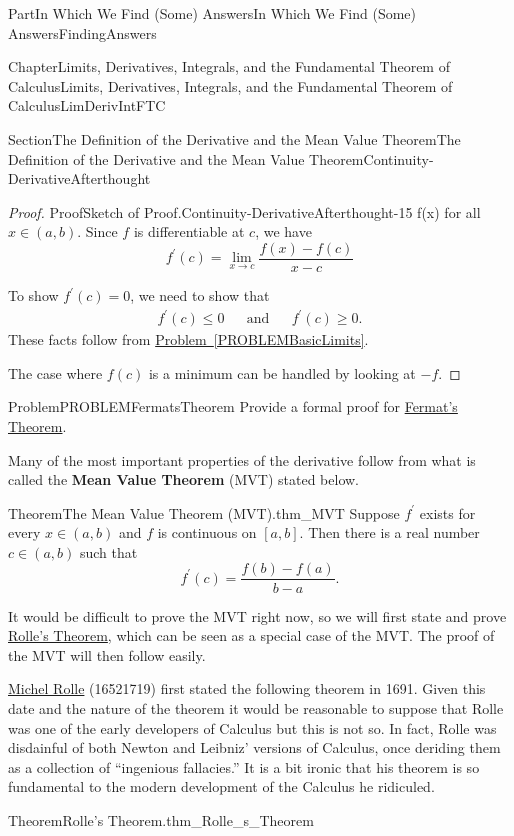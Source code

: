 \documentclass[oneside,10pt,]{book}
\newcommand{\xreffont}{\relax}
\DeclareRobustCommand{\initialismintitle}[1]{\texorpdfstring{#1}{#1}}
\newcommand{\terminology}[1]{\textbf{#1}}
\numberwithin{equation}{part}
\def\limit#1#2#3{{\displaystyle\lim_{#1\rightarrow #2}#3}}
\newcommand{\amp}{&}
\begin{document}
\begin{partptx}{Part}{In Which We Find (Some) Answers}{}{In Which We Find (Some) Answers}{}{}{FindingAnswers}
\begin{chapterptx}{Chapter}{Limits, Derivatives, Integrals, and the Fundamental Theorem of Calculus}{}{Limits, Derivatives, Integrals, and the Fundamental Theorem of Calculus}{}{}{LimDerivIntFTC}
\begin{sectionptx}{Section}{The Definition of  the Derivative and the Mean Value Theorem}{}{The Definition of  the Derivative and the Mean Value Theorem}{}{}{Continuity-DerivativeAfterthought}
\begin{proof}{Proof}{Sketch of Proof.}{Continuity-DerivativeAfterthought-15}
f(x)\) for all \(x\in (a,b)\).  Since \(f\) is differentiable at \(c\), we have%
\begin{equation*}
f^\prime\left(c\right)=\limit{x}{c}{
\frac{f(x)-f(c)}{x-c}}
\end{equation*}
%
\par
To show \(f^\prime\left(c\right)=0\), we need to show that%
\begin{align*}
f^\prime\left(c\right)\le 0 \amp{}\amp{}
\text{and}\amp{}\amp{} f^\prime\left(c\right)\ge 0.
\end{align*}
These facts follow from \hyperref[PROBLEMBasicLimits]{Problem~{\xreffont\ref{PROBLEMBasicLimits}}}.%
\par
The case where \(f(c)\) is a minimum can be handled by looking at \(-f\).%
\end{proof}
\begin{problem}{Problem}{}{PROBLEMFermatsTheorem}%
Provide a formal proof for \hyperref[thm_FermatsTheorem]{Fermat's Theorem}.%
\end{problem}
Many of the most important properties of the derivative follow from what is called the \terminology{Mean Value Theorem} (MVT) stated below.%
\begin{theorem}{Theorem}{The Mean Value Theorem (\initialismintitle{MVT}).}{}{thm_MVT}%
%
Suppose \(f^\prime\) exists for every \(x\in(a,b)\) and \(f\) is continuous on \([a,b]\).  Then there is a real number \(c\in(a,b)\) such that%
\begin{equation*}
f^\prime(c)=\frac{f(b)-f(a)}{b-a}.{} 
\end{equation*}
%
\end{theorem}
It would be difficult to prove the MVT right now,  so we will first state and prove \hyperref[thm_Rolle_s_Theorem]{Rolle's Theorem}, which can be seen as a special case of the MVT. The proof of the MVT will then follow easily.%
\par
{} \href{https://mathshistory.st-andrews.ac.uk/Biographies/Rolle/}{Michel Rolle} (1652\textendash{}1719) first stated the following theorem in 1691.  Given this date and the nature of the theorem it would be reasonable to suppose that Rolle was one of the early developers of Calculus but this is not so.  In fact, Rolle was disdainful of both Newton and Leibniz' versions of Calculus, once deriding them as a collection of ``ingenious fallacies.'' It is a bit ironic that his theorem is so fundamental to the modern development of the Calculus he ridiculed.%
\begin{theorem}{Theorem}{Rolle's Theorem.}{}{thm_Rolle_s_Theorem}%

\end{theorem}
\end{sectionptx}
\end{chapterptx}
\end{partptx}
\end{document}
